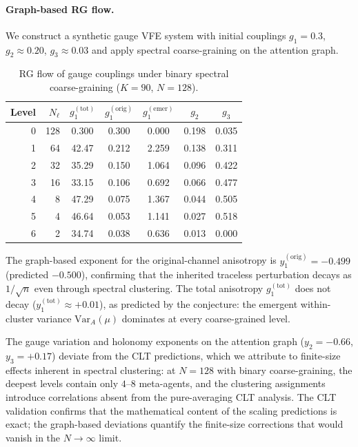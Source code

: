 \documentclass[twoside,11pt]{article}
\begin{document}
\paragraph{Graph-based RG flow.}
We construct a synthetic gauge VFE system with initial couplings $g_1 = 0.3$, $g_2 \approx 0.20$, $g_3 \approx 0.03$ and apply spectral coarse-graining on the attention graph.

\begin{table}[t]
\centering
\caption{RG flow of gauge couplings under binary spectral coarse-graining ($K = 90$, $N = 128$).}
\label{tab:rg_flow_supp}
\begin{tabular}{rrccccc}
\toprule
\textbf{Level} & $N_\ell$ & $g_1^{(\mathrm{tot})}$ & $g_1^{(\mathrm{orig})}$ & $g_1^{(\mathrm{emer})}$ & $g_2$ & $g_3$ \\
\midrule
0 & 128 & 0.300 & 0.300 & 0.000 & 0.198 & 0.035 \\
1 & 64 & 42.47 & 0.212 & 2.259 & 0.138 & 0.311 \\
2 & 32 & 35.29 & 0.150 & 1.064 & 0.096 & 0.422 \\
3 & 16 & 33.15 & 0.106 & 0.692 & 0.066 & 0.477 \\
4 & 8 & 47.29 & 0.075 & 1.367 & 0.044 & 0.505 \\
5 & 4 & 46.64 & 0.053 & 1.141 & 0.027 & 0.518 \\
6 & 2 & 34.74 & 0.038 & 0.636 & 0.013 & 0.000 \\
\bottomrule
\end{tabular}
\end{table}

The graph-based exponent for the original-channel anisotropy is $y_1^{(\mathrm{orig})} = -0.499$ (predicted $-0.500$), confirming that the inherited traceless perturbation decays as $1/\sqrt{n}$ even through spectral clustering. The total anisotropy $g_1^{(\mathrm{tot})}$ does not decay ($y_1^{(\mathrm{tot})} \approx +0.01$), as predicted by the conjecture: the emergent within-cluster variance $\mathrm{Var}_A(\mu)$ dominates at every coarse-grained level.

The gauge variation and holonomy exponents on the attention graph ($y_2 = -0.66$, $y_3 = +0.17$) deviate from the CLT predictions, which we attribute to finite-size effects inherent in spectral clustering: at $N = 128$ with binary coarse-graining, the deepest levels contain only $4$--$8$ meta-agents, and the clustering assignments introduce correlations absent from the pure-averaging CLT analysis. The CLT validation confirms that the mathematical content of the scaling predictions is exact; the graph-based deviations quantify the finite-size corrections that would vanish in the $N \to \infty$ limit.
\end{document}
